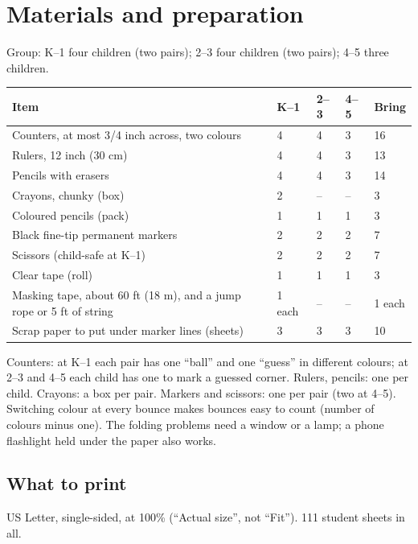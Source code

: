\documentclass[11pt,letterpaper]{article}
\begin{document}
\section{Materials and preparation}

Group: K--1 four children (two pairs); 2--3 four children (two pairs); 4--5 three children.

\smallskip
{\small
\begin{tabularx}{\linewidth}{@{}X l l l l@{}}
\toprule
Item & K--1 & 2--3 & 4--5 & Bring\\
\midrule
Counters, at most 3/4 inch across, two colours & 4 & 4 & 3 & 16\\
Rulers, 12 inch (30 cm) & 4 & 4 & 3 & 13\\
Pencils with erasers & 4 & 4 & 3 & 14\\
Crayons, chunky (box) & 2 & -- & -- & 3\\
Coloured pencils (pack) & 1 & 1 & 1 & 3\\
Black fine-tip permanent markers & 2 & 2 & 2 & 7\\
Scissors (child-safe at K--1) & 2 & 2 & 2 & 7\\
Clear tape (roll) & 1 & 1 & 1 & 3\\
Masking tape, about 60 ft (18 m), and a jump rope or 5 ft of string & 1 each & -- & -- & 1 each\\
Scrap paper to put under marker lines (sheets) & 3 & 3 & 3 & 10\\
\bottomrule
\end{tabularx}}

Counters: at K--1 each pair has one ``ball'' and one ``guess'' in different colours; at 2--3 and 4--5 each child has one to mark a guessed corner. Rulers, pencils: one per child. Crayons: a box per pair. Markers and scissors: one per pair (two at 4--5). Switching colour at every bounce makes bounces easy to count (number of colours minus one). The folding problems need a window or a lamp; a phone flashlight held under the paper also works.

\subsection{What to print}
US Letter, single-sided, at 100\% (``Actual size'', not ``Fit''). 111 student sheets in all.
\end{document}
